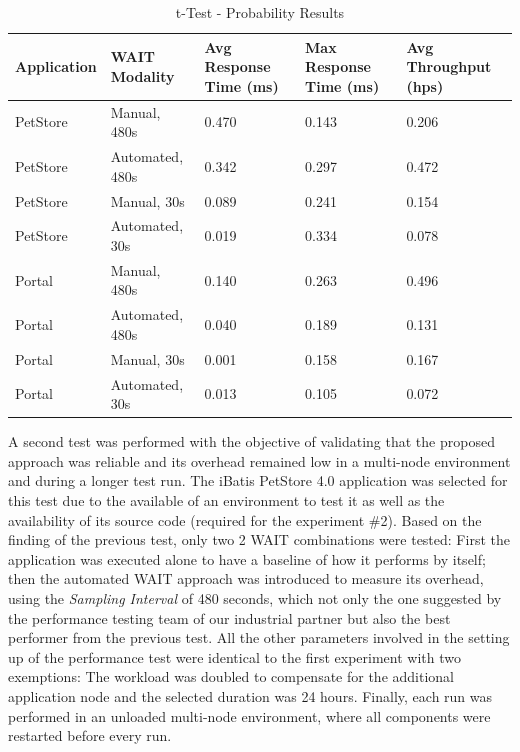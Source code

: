 \documentclass[runningheads,a4paper]{llncs}
\begin{document}
\begin{table}[!h]
\caption{t-Test - Probability Results}
\label{tTest1}
\centering
\begin{tabular}{p{}|p{}|p{}|p{}|p{}}
\hline
\bfseries Application & \bfseries WAIT Modality & \bfseries Avg Response Time
(ms)& \bfseries Max Response Time (ms)& \bfseries Avg Throughput (hps)\\
\hline
PetStore & 	Manual, 480s 			& 0.470 & 0.143	& 0.206\\
PetStore & 	Automated, 480s 		& 0.342	& 0.297	& 0.472\\
PetStore & 	Manual, 30s 			& 0.089	& 0.241	& 0.154\\
PetStore & 	Automated, 30s 			& 0.019	& 0.334	& 0.078\\
\hline
Portal 	& 	Manual, 480s 			& 0.140 & 0.263	& 0.496\\
Portal 	& 	Automated, 480s 		& 0.040	& 0.189	& 0.131\\
Portal 	& 	Manual, 30s 			& 0.001	& 0.158	& 0.167\\
Portal 	& 	Automated, 30s 			& 0.013	& 0.105	& 0.072\\
\hline
\end{tabular}
\end{table}

A second test was performed with the objective of validating that the proposed
approach was reliable and its overhead remained low in a multi-node environment
and during a longer test run. The iBatis PetStore 4.0 application was selected for 
this test due to the available of an environment to test it as well as the
availability of its source code (required for the experiment \#2). Based on the 
finding of the previous test, only two 2 WAIT combinations were tested: First
the application was executed alone to have a baseline of how it performs by itself; 
then the automated WAIT approach was introduced to measure its overhead, using the 
\emph{Sampling Interval} of 480 seconds, which not only the one suggested by
the performance testing team of our industrial partner but also the best 
performer from the previous test. All the other parameters involved in the
setting up of the performance test were identical to the first experiment with 
two exemptions: The workload was doubled to compensate for the additional
application node and the selected duration was 24 hours. Finally, each run was performed 
in an unloaded multi-node environment, where all components were restarted
before every run.
\end{document}
